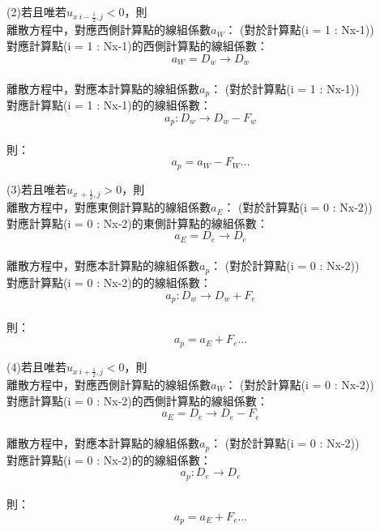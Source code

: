 \documentclass[12pt]{article}
\begin{document}
\noindent (2)若且唯若$u_{x\ i-\frac{1}{2} , j} < 0$，則\\
    離散方程中，對應西側計算點的線組係數$a_{W}$：
    (對於計算點(i = 1 : Nx-1))\\
    對應計算點(i = 1 : Nx-1)的西側計算點的線組係數：\\
    $$a_{W} = D_{w} \rightarrow D_{w} $$\\
    離散方程中，對應本計算點的線組係數$a_{p}$：
    (對於計算點(i = 1 : Nx-1))\\
    對應計算點(i = 1 : Nx-1)的的線組係數：\\
    $$a_{p} : D_{w} \rightarrow D_{w} -F_{w}$$\\
\noindent 則：\\
\begin{equation}
    a_{p} = a_{W} - F_{W} ...
\end{equation}

\noindent (3)若且唯若$u_{x\ +\frac{1}{2} , j} > 0$，則\\
    離散方程中，對應東側計算點的線組係數$a_{E}$：
    (對於計算點(i = 0 : Nx-2))\\
    對應計算點(i = 0 : Nx-2)的東側計算點的線組係數：\\
    $$a_{E} = D_{e} \rightarrow D_{e} $$\\
    離散方程中，對應本計算點的線組係數$a_{p}$：
    (對於計算點(i = 0 : Nx-2))\\
    對應計算點(i = 0 : Nx-2)的的線組係數：\\
    $$a_{p} : D_{w} \rightarrow D_{w} + F_{e}$$\\
\noindent 則：\\
\begin{equation}
    a_{p} = a_{E} + F_{e} ...
\end{equation}

\noindent (4)若且唯若$u_{x\ i+\frac{1}{2} , j} < 0$，則\\
    離散方程中，對應西側計算點的線組係數$a_{W}$：
    (對於計算點(i = 0 : Nx-2))\\
    對應計算點(i = 0 : Nx-2)的西側計算點的線組係數：\\
    $$a_{E} = D_{e} \rightarrow D_{e} - F_{e}$$\\
    離散方程中，對應本計算點的線組係數$a_{p}$：
    (對於計算點(i = 0 : Nx-2))\\
    對應計算點(i = 0 : Nx-2)的的線組係數：\\
    $$a_{p} : D_{e} \rightarrow D_{e}$$\\
\noindent 則：\\
\begin{equation}
    a_{p} = a_{E} + F_{e} ...
\end{equation}
\end{document}
